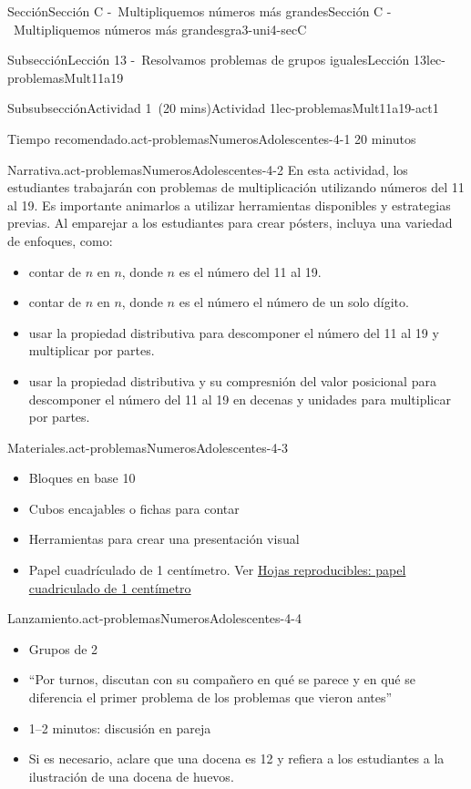 \documentclass[oneside,10pt,]{article}
\begin{document}
\begin{sectionptx}{Sección}{Sección C -~Multipliquemos números más grandes}{}{Sección C -~Multipliquemos números más grandes}{}{}{gra3-uni4-secC}
\begin{subsectionptx}{Subsección}{Lección 13 -~Resolvamos problemas de grupos iguales}{}{Lección 13}{}{}{lec-problemasMult11a19}
\begin{subsubsectionptx}{Subsubsección}{Actividad 1~(20 mins)}{}{Actividad 1}{}{}{lec-problemasMult11a19-act1}
\begin{paragraphs}{Tiempo recomendado.}{act-problemasNumerosAdolescentes-4-1}
20 minutos%
\end{paragraphs}%
\begin{paragraphs}{Narrativa.}{act-problemasNumerosAdolescentes-4-2}%
En esta actividad, los estudiantes trabajarán con problemas de multiplicación utilizando números del 11 al 19. Es importante animarlos a utilizar herramientas disponibles y estrategias previas. Al emparejar a los estudiantes para crear pósters, incluya una variedad de enfoques, como:%
%
\begin{itemize}[label=\textbullet]
\item{}contar de \(n\) en \(n\), donde \(n\) es el número del 11 al 19.%
\item{}contar de \(n\) en \(n\), donde \(n\) es el número el número de un solo dígito.%
\item{}usar la propiedad distributiva para descomponer el número del 11 al 19 y multiplicar por partes.%
\item{}usar la propiedad distributiva y su compresnión del valor posicional para descomponer el número del 11 al 19 en decenas y unidades para multiplicar por partes.%
\end{itemize}
\end{paragraphs}%
\begin{paragraphs}{Materiales.}{act-problemasNumerosAdolescentes-4-3}%
%
\begin{itemize}[label=\textbullet]
\item{}Bloques en base 10%
\item{}Cubos encajables o fichas para contar%
\item{}Herramientas para crear una presentación visual%
\item{}Papel cuadrículado de 1 centímetro. Ver \hyperref[blm-papelCuadriculadoCentimetro]{Hojas reproducibles: papel cuadriculado de 1 centímetro}%
\end{itemize}
\end{paragraphs}%
\begin{paragraphs}{Lanzamiento.}{act-problemasNumerosAdolescentes-4-4}%
%
\begin{itemize}[label=\textbullet]
\item{}Grupos de 2%
\item{}``Por turnos, discutan con su compañero en qué se parece y en qué se diferencia el primer problema de los problemas que vieron antes''%
\item{}1–2 minutos: discusión en pareja%
\item{}Si es necesario, aclare que una docena es 12 y refiera a los estudiantes a la ilustración de una docena de huevos.%

\end{itemize}
\end{paragraphs}
\end{subsubsectionptx}
\end{subsectionptx}
\end{sectionptx}
\end{document}
